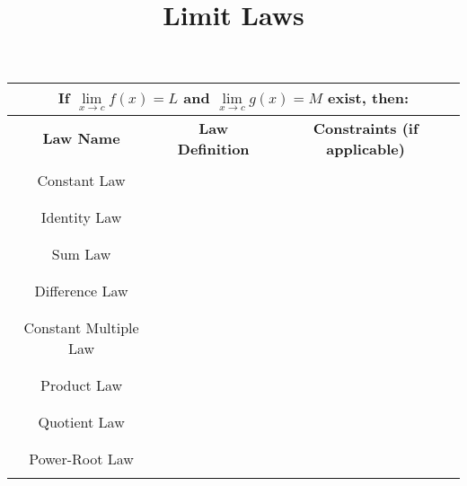 \documentclass{siproblemset}
\title{Limit Laws}
\begin{document}
    \maketitle
    
    
    \begin{center}
        \begin{tabular}{ |c|c|c| } 
            \hline
            \multicolumn{3}{|c|}{If $\lim\limits_{x\to c}f(x)=L$ and $\lim\limits_{x\to c}g(x)=M$ exist, then:}\\[4ex]
            \hline
            \textbf{Law Name} & \textbf{Law Definition} & \textbf{Constraints (if applicable)} \\ 
            \hline
            &&\\
            Constant Law & \hspace{3in} & \\ 
            &&\\
            \hline
            &&\\
            Identity Law & \hspace{3in} & \\ 
            &&\\
            \hline
            &&\\
            Sum Law & \hspace{3in} & \\ 
            &&\\
            \hline
            &&\\
            Difference Law & \hspace{3in} & \\ 
            &&\\
            \hline
            &&\\
            Constant Multiple Law & \hspace{3in} & \\ 
            &&\\
            \hline
            &&\\
            Product Law & \hspace{3in} & \\ 
            &&\\
            \hline
            &&\\
            Quotient Law & \hspace{3in} & \\ 
            &&\\
            \hline
            &&\\
            Power-Root Law & \hspace{3in} & \\ 
            &&\\
            \hline
        \end{tabular}
    \end{center}
    \pagebreak
    
\end{document}
